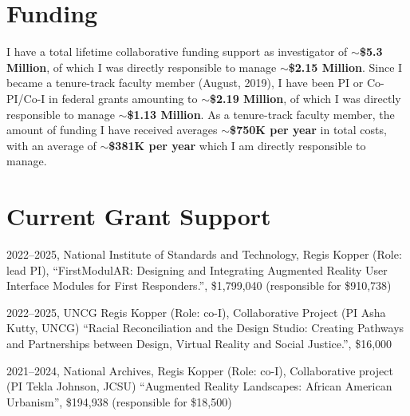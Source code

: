 \documentclass[wideaddress]{vitae}
\let\olditem\item
\def\item{\nopagebreak[4]\olditem}%
\begin{document}
\section{Funding}
    I have a total lifetime collaborative funding support as investigator of \textbf{$\sim$\$5.3 Million}, of which I was directly responsible to manage \textbf{$\sim$\$2.15 Million}. Since I became a tenure-track faculty member (August, 2019), I have been PI or Co-PI/Co-I in federal grants amounting to \textbf{$\sim$\$2.19 Million}, of which I was directly responsible to manage \textbf{$\sim$\$1.13 Million}. As a tenure-track faculty member, the amount of funding I have received averages \textbf{$\sim$\$750K per year} in total costs, with an average of \textbf{$\sim$\$381K per year} which I am directly responsible to manage.%

\section{Current Grant Support}
\begin{etaremune}
	\item{2022--2025, National Institute of Standards and Technology, Regis Kopper (Role: lead PI), ``FirstModulAR: Designing and Integrating Augmented Reality User Interface Modules for First Responders.'', \$1,799,040 (responsible for \$910,738)}
	\item{2022--2025, UNCG Regis Kopper (Role: co-I), Collaborative Project (PI Asha Kutty, UNCG) ``Racial Reconciliation and the Design Studio: Creating Pathways and Partnerships between Design, Virtual Reality and Social Justice.'', \$16,000}
	\item{2021--2024, National Archives, Regis Kopper (Role: co-I), Collaborative project (PI Tekla Johnson, JCSU) ``Augmented Reality Landscapes: African American Urbanism'', \$194,938 (responsible for \$18,500)}
\end{etaremune}
\end{document}
